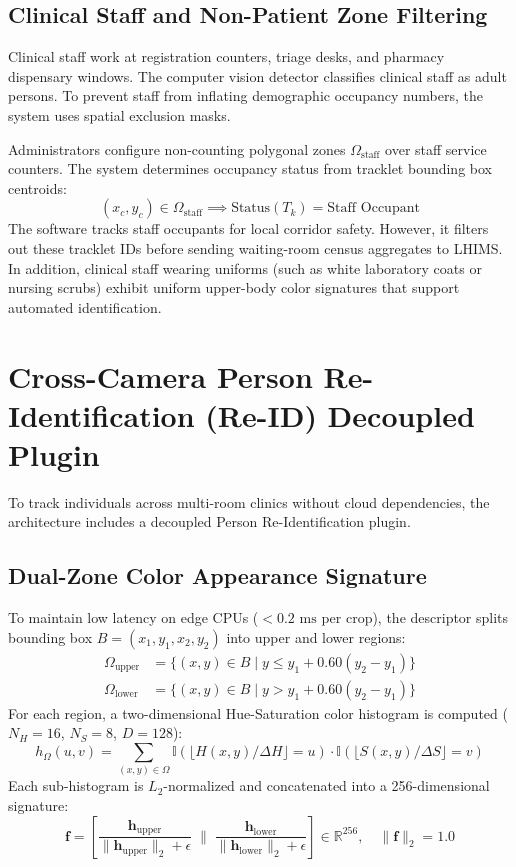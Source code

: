 \subsection{Clinical Staff and Non-Patient Zone Filtering}\label{sec:staff_filtering}
Clinical staff work at registration counters, triage desks, and pharmacy dispensary windows. The computer vision detector classifies clinical staff as adult persons. To prevent staff from inflating demographic occupancy numbers, the system uses spatial exclusion masks.

Administrators configure non-counting polygonal zones $\Omega_{\text{staff}}$ over staff service counters. The system determines occupancy status from tracklet bounding box centroids:
\begin{equation}
    (x_c, y_c) \in \Omega_{\text{staff}} \implies \text{Status}(T_k) = \text{Staff Occupant}
\end{equation}
The software tracks staff occupants for local corridor safety. However, it filters out these tracklet IDs before sending waiting-room census aggregates to LHIMS. In addition, clinical staff wearing uniforms (such as white laboratory coats or nursing scrubs) exhibit uniform upper-body color signatures that support automated identification.

\section{Cross-Camera Person Re-Identification (Re-ID) Decoupled Plugin}
To track individuals across multi-room clinics without cloud dependencies, the architecture includes a decoupled Person Re-Identification plugin.

\subsection{Dual-Zone Color Appearance Signature}
To maintain low latency on edge CPUs ($< 0.2\text{ ms}$ per crop), the descriptor splits bounding box $B = (x_1, y_1, x_2, y_2)$ into upper and lower regions:
\begin{align}
    \Omega_{\text{upper}} &= \{(x, y) \in B \mid y \le y_1 + 0.60(y_2 - y_1)\} \\
    \Omega_{\text{lower}} &= \{(x, y) \in B \mid y > y_1 + 0.60(y_2 - y_1)\}
\end{align}
For each region, a two-dimensional Hue-Saturation color histogram is computed ($N_H = 16$, $N_S = 8$, $D = 128$):
\begin{equation}
    h_{\Omega}(u, v) = \sum_{(x, y) \in \Omega} \mathbb{I}\left( \lfloor H(x, y) / \Delta H \rfloor = u \right) \cdot \mathbb{I}\left( \lfloor S(x, y) / \Delta S \rfloor = v \right)
\end{equation}
Each sub-histogram is $L_2$-normalized and concatenated into a 256-dimensional signature:
\begin{equation}
    \mathbf{f} = \left[ \frac{\mathbf{h}_{\text{upper}}}{\|\mathbf{h}_{\text{upper}}\|_2 + \epsilon} \;\Big\|\; \frac{\mathbf{h}_{\text{lower}}}{\|\mathbf{h}_{\text{lower}}\|_2 + \epsilon} \right] \in \mathbb{R}^{256}, \quad \|\mathbf{f}\|_2 = 1.0
\end{equation}

